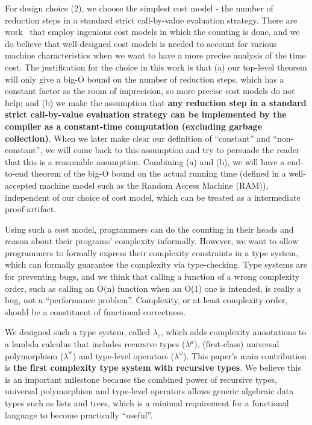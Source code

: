 \documentclass[preprint]{sigplanconf}
\newcommand{\logo}{\lambda_\mathrm{c}}
\begin{document}
For design choice (2), we choose the simplest cost model - the number of reduction steps in a standard strict call-by-value evaluation strategy. There are work~\cite{blelloch2013cache} that employ ingenious cost models in which the counting is done, and we do believe that well-designed cost models is needed to account for various machine characteristics when we want to have a more precise analysis of the time cost. The justification for the choice in this work is that (a) our top-level theorem will only give a big-O bound on the number of reduction steps, which has a constant factor as the room of imprecision, so more precise cost models do not help; and (b) we make the assumption that {\bf any reduction step in a standard strict call-by-value evaluation strategy can be implemented by the compiler as a constant-time computation (excluding garbage collection)}. When we later make clear our definition of ``constant'' and ``non-constant'', we will come back to this assumption and try to persuade the reader that this is a reasonable assumption. Combining (a) and (b), we will have a end-to-end theorem of the big-O bound on the actual running time (defined in a well-accepted machine model such as the Random Access Machine (RAM)), independent of our choice of cost model, which can be treated as a intermediate proof artifact.

Using such a cost model, programmers can do the counting in their heads and reason about their programs' complexity informally. However, we want to allow programmers to formally express their complexity constraints in a type system, which can formally guarantee the complexity via type-checking. Type systems are for preventing bugs, and we think that calling a function of a wrong complexity order, such as calling an O(n) function when an O(1) one is intended, is really a bug, not a ``performance problem''. Complexity, or at least complexity order, should be a constituent of functional correctness.

We designed such a type system, called $\logo$, which adds complexity annotations to a lambda calculus that includes recursive types ($\lambda^\mu$), (first-class) universal polymorphism ($\lambda^\forall$) and type-level operators ($\lambda^\omega$). This paper's main contribution is {\bf the first complexity type system with recursive types}. We believe this is an important milestone because the combined power of recursive types, universal polymorphism and type-level operators allows generic algebraic data types such as lists and trees, which is a minimal requirement for a functional language to become practically ``useful''.
\end{document}
